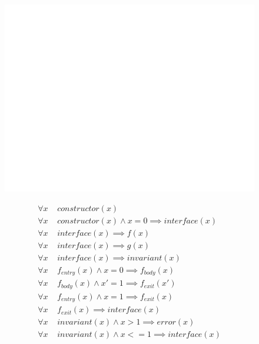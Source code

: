 \documentclass[aspectratio=169,10pt]{beamer}
\begin{document}
\begin{frame}[fragile]
\begin{figure}
\noindent\begin{minipage}{.49\textwidth}
	\includegraphics[scale=0.3]{images/state_machine}
\end{minipage}
\noindent\begin{minipage}{.49\textwidth}
{\small
\begin{align*}
	\forall x \;\;\;\; constructor(x)\\
	\forall x \;\;\;\; constructor(x) \land x = 0 \implies interface(x)\\
	\forall x \;\;\;\; interface(x) \implies f(x)\\
	\forall x \;\;\;\; interface(x) \implies g(x)\\
	\forall x \;\;\;\; interface(x) \implies invariant(x)\\
	\forall x \;\;\;\; f_{entry}(x) \land x = 0 \implies f_{body}(x)\\
	\forall x \;\;\;\; f_{body}(x) \land x' = 1 \implies f_{exit}(x')\\
	\forall x \;\;\;\; f_{entry}(x) \land x = 1 \implies f_{exit}(x)\\
	\forall x \;\;\;\; f_{exit}(x) \implies interface(x)\\
	\forall x \;\;\;\; invariant(x) \land x > 1 \implies error(x)\\
	\forall x \;\;\;\; invariant(x) \land x <= 1 \implies interface(x)
\end{align*}
}%
\end{minipage}
\end{figure}
\end{frame}
\end{document}
